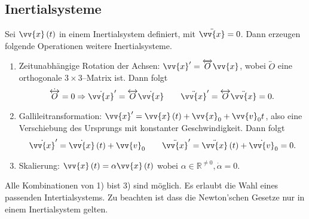 \documentclass[a4paper,12pt]{article}
\numberwithin{equation}{section}
\begin{document}
\subsection{Inertialsysteme}
Sei $\vv{x}\left(t\right)$ in einem Inertialsystem definiert, mit $\ddot{\vv{x}}=0$. Dann erzeugen folgende Operationen weitere Inertialsysteme.
\begin{enumerate}[label=\arabic*)]
        \item Zeitunabhängige Rotation der Achsen: $\vv{x}'=\overleftrightarrow{O}\vv{x}$, wobei $\overleftrightarrow{O}$ eine orthogonale $3\times 3$--Matrix ist. Dann folgt
                \[ 
                        \dot{\overleftrightarrow{O}}=0\Rightarrow \dot{\vv{x}}'=\overleftrightarrow{O}\dot{\vv{x}}\qquad \ddot{\vv{x}}'=\overleftrightarrow{O}\ddot{\vv{x}}=0
                .\] 
        \item Gallileitransformation: $\vv{x}'=\vv{x}\left(t\right)+\vv{x}_0+\vv{v}_0t$, also eine Verschiebung des Ursprungs mit konstanter Geschwindigkeit. Dann folgt
                \[ 
                        \dot{\vv{x}}'=\dot{\vv{x}}\left(t\right)+\vv{v}_0\qquad \ddot{\vv{x}}'=\ddot{\vv{x}}\left(t\right)+\dot{\vv{v}}_0=0
                .\] 
        \item Skalierung: $\vv{x}\left(t\right)=\alpha \vv{x}\left(t\right)$ wobei $\alpha  \in \mathbb{R}^{\neq 0},\dot{\alpha }=0$. 
\end{enumerate}
Alle Kombinationen von 1) bist 3) sind möglich. Es erlaubt die Wahl eines passenden Intertialsystems. Zu beachten ist dass die Newton'schen Gesetze nur in einem Inertialsystem gelten. 
\end{document}
